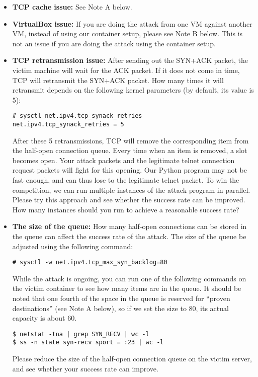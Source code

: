 \begin{itemize}
  \item \textbf{TCP cache issue:} See Note A below.

  \item \textbf{VirtualBox issue:} If you are doing the attack from one VM against another VM, 
    instead of using our container setup, please see Note B below. This is not an issue
    if you are doing the attack using the container setup.

  \item \textbf{TCP retransmission issue:} 
    After sending out the SYN+ACK packet, the victim machine will wait for 
    the ACK packet. If it does not come in time, TCP will retransmit the SYN+ACK packet. 
    How many times it will retransmit depends on the following kernel parameters (by default,
    its value is 5):
    
\begin{lstlisting}
# sysctl net.ipv4.tcp_synack_retries
net.ipv4.tcp_synack_retries = 5
\end{lstlisting}

    After these 5 retransmissions, TCP will remove the corresponding item
    from the half-open connection queue. Every time when an item is removed,
    a slot becomes open. Your attack packets and the legitimate 
    telnet connection request packets will fight for this opening.
    Our Python program may not be fast enough, and can thus lose to 
    the legitimate telnet packet. To win the competition, we can run multiple instances
    of the attack program in parallel. Please try this approach and 
    see whether the success rate can be improved. How many instances 
    should you run to achieve a reasonable success rate? 

  \item \textbf{The size of the queue:}  
    How many half-open connections can be stored in the queue
    can affect the success rate of the attack. 
    The size of the queue be adjusted using the following command:

\begin{lstlisting}
# sysctl -w net.ipv4.tcp_max_syn_backlog=80
\end{lstlisting}
     
    While the attack is ongoing, you can run one of the following commands 
    on the victim container to see
    how many items are in the queue. It should be noted that one fourth of the 
    space in the queue is reserved for ``proven destinations'' (see Note A below), 
    so if we set the size to 80, its actual capacity is about 60. 

\begin{lstlisting}
$ netstat -tna | grep SYN_RECV | wc -l
$ ss -n state syn-recv sport = :23 | wc -l
\end{lstlisting}

    Please reduce the size of the half-open connection queue on the 
    victim server, and see whether your success rate can improve. 
\end{itemize}


